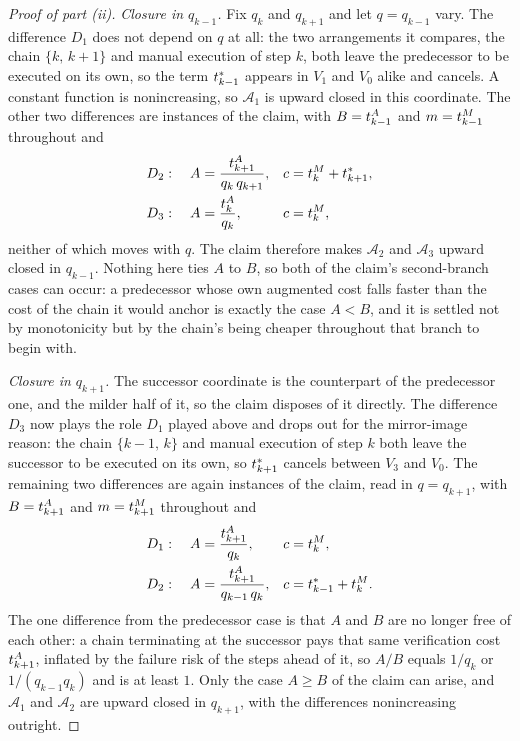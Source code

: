 \begin{proof}[Proof of part (ii)]
\emph{Closure in $q_{k-1}$.}
Fix $q_k$ and $q_{k+1}$ and let $q = q_{k-1}$ vary.
The difference $D_1$ does not depend on $q$ at all: the two arrangements it compares, the chain $\{k,\, k+1\}$ and manual execution of step $k$, both leave the predecessor to be executed on its own, so the term $t^*_{k-1}$ appears in $V_1$ and $V_0$ alike and cancels.
A constant function is nonincreasing, so $\mathcal{A}_1$ is upward closed in this coordinate.
The other two differences are instances of the claim, with $B = t^{A}_{k-1}$ and $m = t^{M}_{k-1}$ throughout and
\begin{align*}
D_2: \quad A &= \frac{t^{A}_{k+1}}{q_k\, q_{k+1}}, & c &= t^{M}_{k} + t^*_{k+1}, \\
D_3: \quad A &= \frac{t^{A}_{k}}{q_k}, & c &= t^{M}_{k},
\end{align*}
neither of which moves with $q$.
The claim therefore makes $\mathcal{A}_2$ and $\mathcal{A}_3$ upward closed in $q_{k-1}$.
Nothing here ties $A$ to $B$, so both of the claim's second-branch cases can occur: a predecessor whose own augmented cost falls faster than the cost of the chain it would anchor is exactly the case $A < B$, and it is settled not by monotonicity but by the chain's being cheaper throughout that branch to begin with.

\emph{Closure in $q_{k+1}$.}
The successor coordinate is the counterpart of the predecessor one, and the milder half of it, so the claim disposes of it directly.
The difference $D_3$ now plays the role $D_1$ played above and drops out for the mirror-image reason: the chain $\{k-1,\, k\}$ and manual execution of step $k$ both leave the successor to be executed on its own, so $t^*_{k+1}$ cancels between $V_3$ and $V_0$.
The remaining two differences are again instances of the claim, read in $q = q_{k+1}$, with $B = t^{A}_{k+1}$ and $m = t^{M}_{k+1}$ throughout and
\begin{align*}
D_1: \quad A &= \frac{t^{A}_{k+1}}{q_k}, & c &= t^{M}_{k}, \\
D_2: \quad A &= \frac{t^{A}_{k+1}}{q_{k-1}\, q_k}, & c &= t^*_{k-1} + t^{M}_{k} .
\end{align*}
The one difference from the predecessor case is that $A$ and $B$ are no longer free of each other: a chain terminating at the successor pays that same verification cost $t^{A}_{k+1}$, inflated by the failure risk of the steps ahead of it, so $A/B$ equals $1/q_k$ or $1/(q_{k-1} q_k)$ and is at least $1$.
Only the case $A \geq B$ of the claim can arise, and $\mathcal{A}_1$ and $\mathcal{A}_2$ are upward closed in $q_{k+1}$, with the differences nonincreasing outright.


\end{proof}
